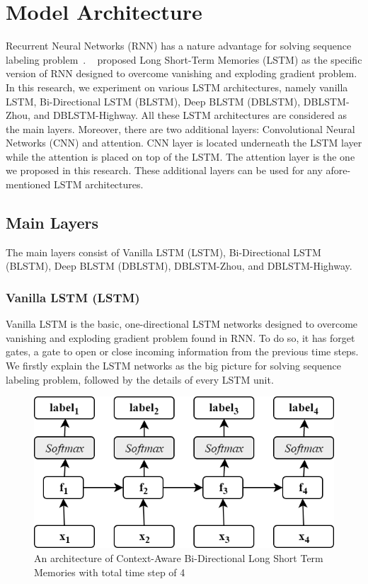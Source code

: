 \section{Model Architecture}
Recurrent Neural Networks (RNN) has a nature advantage for solving sequence labeling problem~\cite{zhou2015end}. ~\cite{hochreiter1997long} proposed Long Short-Term Memories (LSTM) as the specific version of RNN designed to overcome vanishing and exploding gradient problem. In this research, we experiment on various LSTM architectures, namely vanilla LSTM, Bi-Directional LSTM (BLSTM), Deep BLSTM (DBLSTM), DBLSTM-Zhou, and DBLSTM-Highway. All these LSTM architectures are considered as the main layers. Moreover, there are two additional layers: Convolutional Neural Networks (CNN) and attention. CNN layer is located underneath the LSTM layer while the attention is placed on top of the LSTM. The attention layer is the one we proposed in this research. These additional layers can be used for any afore-mentioned LSTM architectures.

\subsection{Main Layers}
The main layers consist of Vanilla LSTM (LSTM), Bi-Directional LSTM (BLSTM), Deep BLSTM (DBLSTM), DBLSTM-Zhou, and DBLSTM-Highway.

\subsubsection{Vanilla LSTM (LSTM)}
Vanilla LSTM is the basic, one-directional LSTM networks designed to overcome vanishing and exploding gradient problem found in RNN. To do so, it has forget gates, a gate to open or close incoming information from the previous time steps. We firstly explain the LSTM networks as the big picture for solving sequence labeling problem, followed by the details of every LSTM unit. 

\begin{figure}
	\centering
	\includegraphics[width=0.75\linewidth]{images/olstm}
	\caption{An architecture of Context-Aware Bi-Directional Long Short Term Memories with total time step of 4}
	\label{fig:olstm}
\end{figure}

